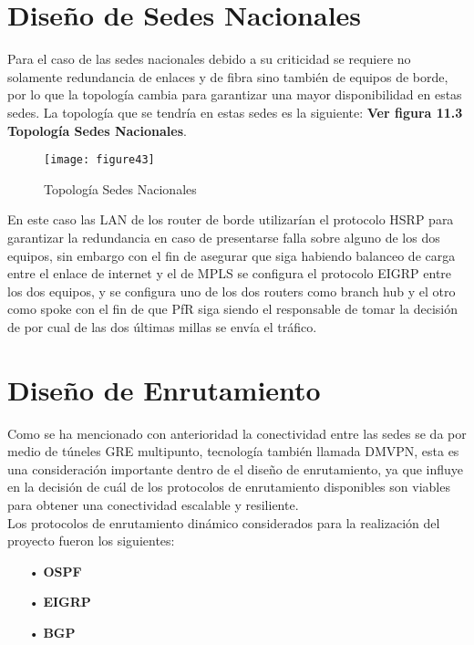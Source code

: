 \section{Diseño de Sedes Nacionales} %
\label{sec:Diseño de Sedes Nacionales}

Para el caso de las sedes nacionales debido a su criticidad se requiere no solamente redundancia de enlaces y de fibra sino también de equipos de borde, por lo que la topología cambia para garantizar una mayor disponibilidad en estas sedes. La topología que se tendría en estas sedes es la siguiente: \textbf{Ver figura 11.3 Topología Sedes Nacionales}.

\begin{figure}[htbp]
  \centering
    {\texttt{[image: figure43]}}%
  \caption{Topología Sedes Nacionales}
  \label{fig:fig2subfig}
\end{figure}

En este caso las LAN de los router de borde utilizarían el protocolo HSRP para garantizar la redundancia en caso de presentarse falla sobre alguno de los dos equipos, sin embargo con el fin de asegurar que siga habiendo balanceo de carga entre el enlace de internet y el de MPLS se configura el protocolo EIGRP entre los dos equipos, y se configura uno de los dos routers como branch hub y el otro como spoke con el fin de que PfR siga siendo el responsable de tomar la decisión de por cual de las dos últimas millas se envía el tráfico.

\section{Diseño de Enrutamiento} %
\label{sec:Diseño de Enrutamiento}


Como se ha mencionado con anterioridad la conectividad entre las sedes se da por medio de túneles GRE multipunto, tecnología también llamada DMVPN, esta es una consideración importante dentro de el diseño de enrutamiento, ya que influye en la decisión de cuál de los protocolos de enrutamiento disponibles son viables para obtener una conectividad escalable y resiliente.
\\
Los protocolos de enrutamiento dinámico considerados para la realización del proyecto fueron los siguientes:

\begin{itemize}
\item[•]\textbf{OSPF}
\item[•]\textbf{EIGRP}
\item[•]\textbf{BGP}
\end{itemize}

